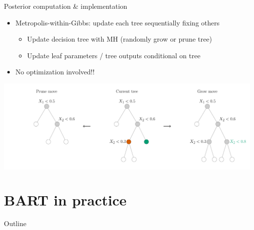 \documentclass[aspectratio=199]{beamer}
\begin{document}
\begin{frame}{Posterior computation \& implementation}

\begin{itemize}
\item{Metropolis-within-Gibbs: update each tree sequentially fixing others}
\begin{itemize}
\item{Update decision tree with MH (randomly grow or prune tree)}
\item{Update leaf parameters / tree outputs conditional on tree}
\end{itemize}
\item{No optimization involved!!}
\end{itemize}

\begin{center}
\includegraphics[width = \textwidth]{figures/grow_prune}
\end{center}

\end{frame}


\section{BART in practice}
\begin{frame}[noframenumbering]{Outline}
\tableofcontents[currentsection]
\end{frame}
\end{document}
